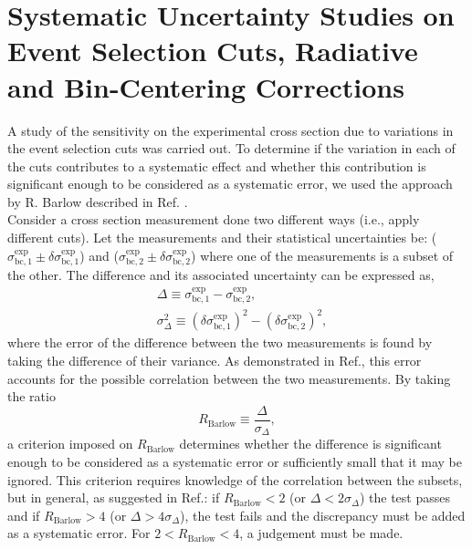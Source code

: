 \documentclass[aps, prl]{revtex4-2}  %
\begin{document}
\section{\large Systematic Uncertainty Studies on Event Selection Cuts, Radiative and Bin-Centering Corrections }
A study of the sensitivity on the experimental cross section due to variations in the event selection cuts was carried out. 
To determine if the variation in each of the cuts contributes to a systematic effect and whether this contribution is significant
enough to be considered as a systematic error, we used the approach by R. Barlow described in Ref. \cite{barlow2002systematic}.\\
\indent Consider a cross section measurement done two different ways (i.e., apply different cuts). Let the measurements and their
statistical uncertainties be: ($\sigma^{\mathrm{exp}}_{\mathrm{bc,1}}\pm\delta\sigma^{\mathrm{exp}}_{\mathrm{bc,1}}$) and ($\sigma^{\mathrm{exp}}_{\mathrm{bc,2}}\pm\delta\sigma^{\mathrm{exp}}_{\mathrm{bc,2}}$)
where one of the measurements is a subset of the other. The difference and its associated uncertainty can be expressed as,
\begin{subequations}
  \begin{align}
    &\Delta \equiv \sigma^{\mathrm{exp}}_{\mathrm{bc,1}} - \sigma^{\mathrm{exp}}_{\mathrm{bc,2}}, \\
    &\sigma^{2}_{\Delta} \equiv (\delta\sigma^{\mathrm{exp}}_{\mathrm{bc,1}})^{2} - (\delta\sigma^{\mathrm{exp}}_{\mathrm{bc,2}})^{2},
  \end{align}
\end{subequations}
where the error of the difference between the two measurements is found by taking the difference of their variance. As demonstrated in Ref.\cite{barlow2002systematic}, this
error accounts for the possible correlation between the two measurements. By taking the ratio
\begin{equation}
  R_{\mathrm{Barlow}} \equiv \frac{\Delta}{\sigma_{\Delta}},
\end{equation}
a criterion imposed on $R_{\mathrm{Barlow}}$ determines whether the difference is significant enough to be considered as a systematic error or sufficiently small that it may be
ignored. This criterion requires knowledge of the correlation between the subsets, but in general, as suggested in Ref.\cite{barlow2017}: if $R_{\mathrm{Barlow}} < 2$ (or $\Delta <2\sigma_{\Delta}$)
the test passes and if $R_{\mathrm{Barlow}} > 4$ (or $\Delta >4\sigma_{\Delta}$), the test fails and the discrepancy must be added as a systematic error. For $2<R_{\mathrm{Barlow}}<4$, a judgement must be made.\\
\end{document}
